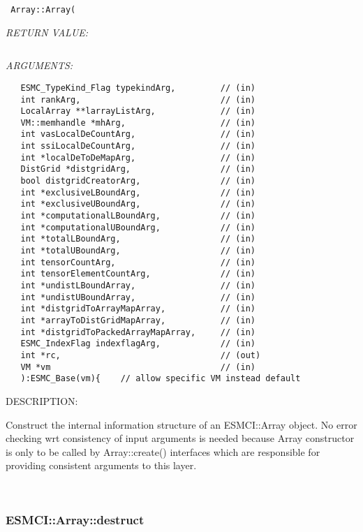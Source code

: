   
\begin{verbatim} Array::Array(\end{verbatim}{\em RETURN VALUE:}
\begin{verbatim} \end{verbatim}{\em ARGUMENTS:}
\begin{verbatim}   ESMC_TypeKind_Flag typekindArg,         // (in)
   int rankArg,                            // (in)
   LocalArray **larrayListArg,             // (in)
   VM::memhandle *mhArg,                   // (in)
   int vasLocalDeCountArg,                 // (in)
   int ssiLocalDeCountArg,                 // (in)
   int *localDeToDeMapArg,                 // (in)
   DistGrid *distgridArg,                  // (in)
   bool distgridCreatorArg,                // (in)
   int *exclusiveLBoundArg,                // (in)
   int *exclusiveUBoundArg,                // (in)
   int *computationalLBoundArg,            // (in)
   int *computationalUBoundArg,            // (in)
   int *totalLBoundArg,                    // (in)
   int *totalUBoundArg,                    // (in)
   int tensorCountArg,                     // (in)
   int tensorElementCountArg,              // (in)
   int *undistLBoundArray,                 // (in)
   int *undistUBoundArray,                 // (in)
   int *distgridToArrayMapArray,           // (in)
   int *arrayToDistGridMapArray,           // (in)
   int *distgridToPackedArrayMapArray,     // (in)
   ESMC_IndexFlag indexflagArg,            // (in)
   int *rc,                                // (out)
   VM *vm                                  // (in)
   ):ESMC_Base(vm){    // allow specific VM instead default\end{verbatim}
{\sf DESCRIPTION:\\ }


      Construct the internal information structure of an ESMCI::Array object.
      No error checking wrt consistency of input arguments is needed because
      Array constructor is only to be called by Array::create() interfaces which
      are responsible for providing consistent arguments to this layer.
   
 
\mbox{}\hrulefill\
 
\subsubsection [ESMCI::Array::destruct] {ESMCI::Array::destruct}


